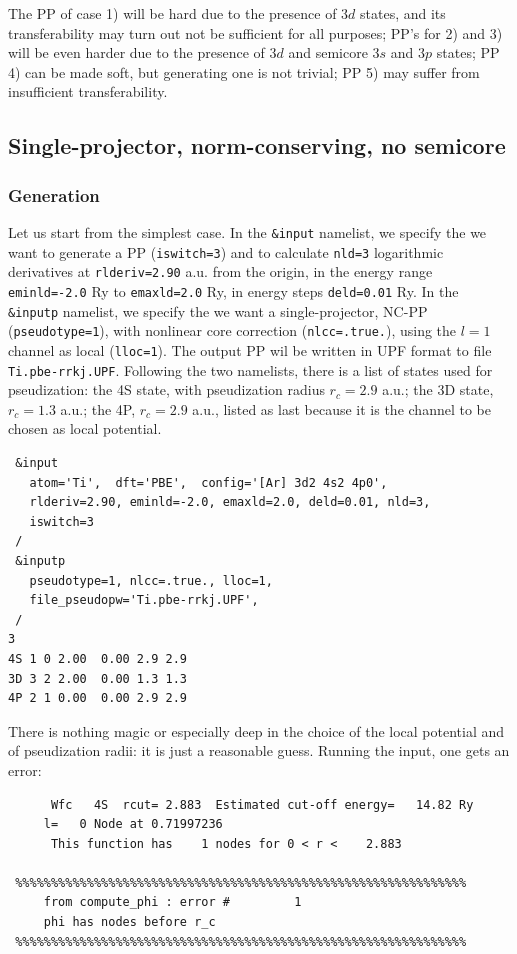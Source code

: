 \documentclass[12pt,a4paper]{article}
\begin{document}
The PP of case 1) will be hard due to the presence of $3d$ states, and 
its transferability may turn out not be sufficient for all purposes;
PP's for 2) and 3) will be even harder due to the presence of $3d$ and
semicore $3s$ and $3p$ states; PP 4) can be made soft, but generating
one is not trivial; PP 5) may suffer from insufficient transferability.

\subsection {Single-projector, norm-conserving, no semicore}

\subsubsection{Generation}
Let us start from the simplest case. In the \texttt{\&input} namelist,
we specify the we want to generate a PP (\texttt{iswitch=3}) and to
calculate \texttt{nld=3} logarithmic derivatives at \texttt{rlderiv=2.90} a.u.
from the origin, in the energy range \texttt{eminld=-2.0} Ry to 
\texttt{emaxld=2.0} Ry, in energy steps \texttt{deld=0.01} Ry.
In the \texttt{\&inputp} namelist, we specify the we want a single-projector,
NC-PP (\texttt{pseudotype=1}), with nonlinear core correction 
(\texttt{nlcc=.true.}), using the $l=1$ channel as local (\texttt{lloc=1}).
The output PP wil be written in UPF format to file \texttt{Ti.pbe-rrkj.UPF}.
Following the two namelists, there is a list of states used for pseudization:
the 4S state, with pseudization radius $r_c=2.9$ a.u.; the 3D state,
 $r_c=1.3$ a.u.; the 4P, $r_c=2.9$ a.u.,  listed as last because it is
the channel to be chosen as local potential.
\begin{verbatim}
 &input
   atom='Ti',  dft='PBE',  config='[Ar] 3d2 4s2 4p0',
   rlderiv=2.90, eminld=-2.0, emaxld=2.0, deld=0.01, nld=3,
   iswitch=3
 /
 &inputp
   pseudotype=1, nlcc=.true., lloc=1,
   file_pseudopw='Ti.pbe-rrkj.UPF',
 /
3
4S 1 0 2.00  0.00 2.9 2.9
3D 3 2 2.00  0.00 1.3 1.3
4P 2 1 0.00  0.00 2.9 2.9
\end{verbatim}
There is nothing magic or especially deep in the choice of the local 
potential and of pseudization radii: it is just a reasonable guess.
Running the input, one gets an error:
\begin{verbatim}
      Wfc   4S  rcut= 2.883  Estimated cut-off energy=   14.82 Ry
     l=   0 Node at 0.71997236
      This function has    1 nodes for 0 < r <    2.883

 %%%%%%%%%%%%%%%%%%%%%%%%%%%%%%%%%%%%%%%%%%%%%%%%%%%%%%%%%%%%%%%
     from compute_phi : error #         1
     phi has nodes before r_c
 %%%%%%%%%%%%%%%%%%%%%%%%%%%%%%%%%%%%%%%%%%%%%%%%%%%%%%%%%%%%%%%
\end{verbatim}
\end{document}
